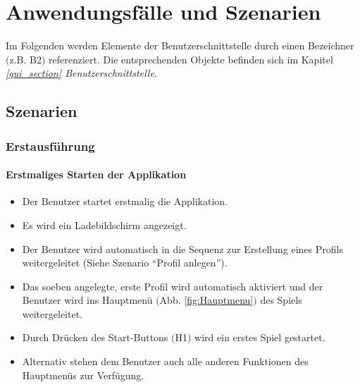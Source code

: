 \section{Anwendungsfälle und Szenarien}

Im Folgenden werden Elemente der Benutzerschnittstelle durch einen Bezeichner $($z.B. B2$)$ referenziert. Die entsprechenden Objekte befinden sich im Kapitel \textit{\ref{gui_section} Benutzerschnittstelle}.

\subsection{Szenarien}


\subsubsection{Erstausführung}
\paragraph{Erstmaliges Starten der Applikation}
\begin{itemize}
	\item Der Benutzer startet erstmalig die Applikation.
	\item Es wird ein Ladebildschirm angezeigt.
	\item Der Benutzer wird automatisch in die Sequenz zur Erstellung eines Profils weitergeleitet (Siehe Szenario "`Profil anlegen"').
	\item Das soeben angelegte, erste Profil wird automatisch aktiviert und der Benutzer wird ins Hauptmenü $($Abb. \ref{fig:Hauptmenu}$)$ des Spiels weitergeleitet.
	\item Durch Drücken des Start-Buttons $($H1$)$ wird ein erstes Spiel gestartet.
	\item Alternativ stehen dem Benutzer auch alle anderen Funktionen des Hauptmenüs zur Verfügung.
\end{itemize}
